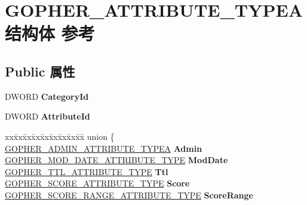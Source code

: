 \hypertarget{struct_g_o_p_h_e_r___a_t_t_r_i_b_u_t_e___t_y_p_e_a}{}\section{G\+O\+P\+H\+E\+R\+\_\+\+A\+T\+T\+R\+I\+B\+U\+T\+E\+\_\+\+T\+Y\+P\+E\+A结构体 参考}
\label{struct_g_o_p_h_e_r___a_t_t_r_i_b_u_t_e___t_y_p_e_a}
\subsection*{Public 属性}
\begin{DoxyCompactItemize}
\item 
\mbox{\label{struct_g_o_p_h_e_r___a_t_t_r_i_b_u_t_e___t_y_p_e_a_a46ae06e535e970651f9d6497bed02baf}} 
D\+W\+O\+RD {\bfseries Category\+Id}
\item 
\mbox{\label{struct_g_o_p_h_e_r___a_t_t_r_i_b_u_t_e___t_y_p_e_a_ae6d5ea3cd78d365971f4c58925c9513c}} 
D\+W\+O\+RD {\bfseries Attribute\+Id}
\item 
\mbox{\label{struct_g_o_p_h_e_r___a_t_t_r_i_b_u_t_e___t_y_p_e_a_a81c0ff80582af6d785a15a75b32dead4}} 
\begin{tabbing}
xx\=xx\=xx\=xx\=xx\=xx\=xx\=xx\=xx\=\kill
union \{\\
\>\hyperlink{struct_g_o_p_h_e_r___a_d_m_i_n___a_t_t_r_i_b_u_t_e___t_y_p_e_a}{GOPHER\_ADMIN\_ATTRIBUTE\_TYPEA} {\bfseries Admin}\\
\>\hyperlink{struct_g_o_p_h_e_r___m_o_d___d_a_t_e___a_t_t_r_i_b_u_t_e___t_y_p_e}{GOPHER\_MOD\_DATE\_ATTRIBUTE\_TYPE} {\bfseries ModDate}\\
\>\hyperlink{struct_g_o_p_h_e_r___t_t_l___a_t_t_r_i_b_u_t_e___t_y_p_e}{GOPHER\_TTL\_ATTRIBUTE\_TYPE} {\bfseries Ttl}\\
\>\hyperlink{struct_g_o_p_h_e_r___s_c_o_r_e___a_t_t_r_i_b_u_t_e___t_y_p_e}{GOPHER\_SCORE\_ATTRIBUTE\_TYPE} {\bfseries Score}\\
\>\hyperlink{struct_g_o_p_h_e_r___s_c_o_r_e___r_a_n_g_e___a_t_t_r_i_b_u_t_e___t_y_p_e}{GOPHER\_SCORE\_RANGE\_ATTRIBUTE\_TYPE} {\bfseries ScoreRange}\\

\end{tabbing}
\end{DoxyCompactItemize}
